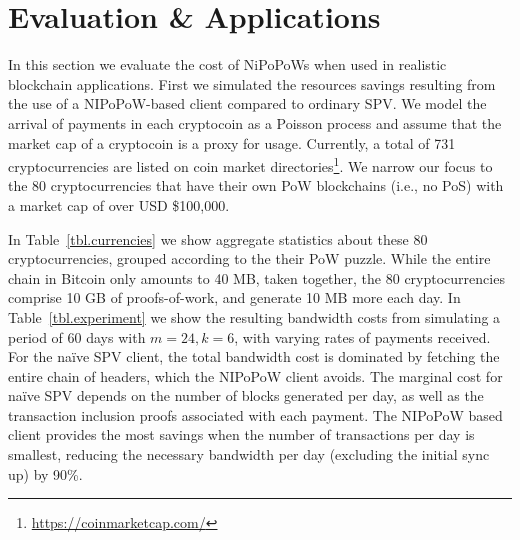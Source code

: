 \section{Evaluation \& Applications}
\label{sec.applications}
In this section we evaluate the cost of NiPoPoWs when used in realistic blockchain applications.
First we simulated the resources savings resulting from the use of a NIPoPoW-based
client compared to ordinary SPV. We model the arrival of payments in each cryptocoin as a Poisson process
and assume that the market cap of a cryptocoin is a proxy for usage. Currently,
a total of 731 cryptocurrencies are listed on coin market
directories\footnote{\url{https://coinmarketcap.com/}}. We narrow our focus to
the 80 cryptocurrencies that have their own PoW blockchains (i.e., no PoS) with
a market cap of over USD \$100,000.

In Table~\ref{tbl.currencies} we show aggregate statistics about these 80
cryptocurrencies, grouped according to the their PoW puzzle. While the entire
chain in Bitcoin only amounts to 40 MB, taken together, the 80 cryptocurrencies
comprise 10 GB of proofs-of-work, and generate 10 MB more each day. In
Table~\ref{tbl.experiment} we show the resulting bandwidth costs from simulating
a period of 60 days with $m=24, k=6$, with varying rates of payments received.
%
For the na\"ive SPV client, the total bandwidth cost is dominated by fetching
the entire chain of headers, which the NIPoPoW client avoids. The marginal
cost for na\"ive SPV depends on the number of blocks generated per day, as well
as the transaction inclusion proofs associated with each payment. The NIPoPoW
based client provides the most savings when the number of transactions per day
is smallest, reducing the necessary bandwidth per day (excluding the initial
sync up) by 90\%.

